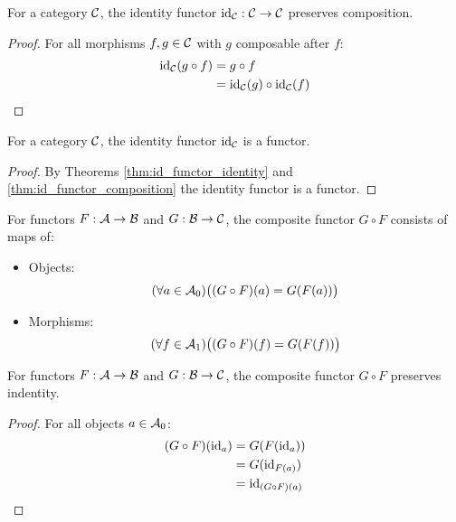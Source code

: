 \begin{theorem}
  For a category $\mathcal{C}$, the identity functor $\mathrm{id}_{\mathcal{C}}: \mathcal{C} \to \mathcal{C}$ preserves
  composition.

  \begin{proof}
    For all morphisms $f,g\in \mathcal{C}$ with $g$ composable after $f$:
    \[
      \begin{aligned}
        \mathrm{id}_{\mathcal{C}}(g\circ f)
        &= g\circ f\\
        &= \mathrm{id}_{\mathcal{C}}(g) \circ \mathrm{id}_{\mathcal{C}}(f)
      \end{aligned}
    \]
  \end{proof}
\end{theorem}

\begin{theorem}[$\id_\C$ is a Functor]
  For a category $\mathcal{C}$, the identity functor $\id_\C$ is a functor.

  \begin{proof}
    By Theorems \ref{thm:id_functor_identity} and
    \ref{thm:id_functor_composition} the identity functor is a functor.
  \end{proof}
\end{theorem}

\begin{definition} For functors $F:\mathcal{A}\to \mathcal{B}$ and
  $G:\mathcal{B}\to \mathcal{C}$, the composite functor $G\circ F$ consists of maps of:
  \parencite{leinster:basic_category_theory}
  \begin{itemize}
    \item Objects:
      \[(\forall a \in \mathcal{A}_0)
        \big((G\circ F)(a) = G(F(a))\big)\]
    \item Morphisms:
      \[(\forall f\in \mathcal{A}_1)
        \big((G\circ F)(f) = G(F(f))\big)\]
  \end{itemize}
\end{definition}

\begin{theorem}
  For functors $F:\mathcal{A}\to \mathcal{B}$ and $G:\mathcal{B}\to \mathcal{C}$, the composite functor $G\circ F$
  preserves indentity.

  \begin{proof}
    For all objects $a\in \mathcal{A}_0$:
    \[
      \begin{aligned}
        (G\circ F)(\mathrm{id}_a)
        &= G(F(\mathrm{id}_a))\\
        &= G(\mathrm{id}_{F(a)})\\
        &= \mathrm{id}_{(G\circ F)(a)}
      \end{aligned}
    \]
  \end{proof}
\end{theorem}

